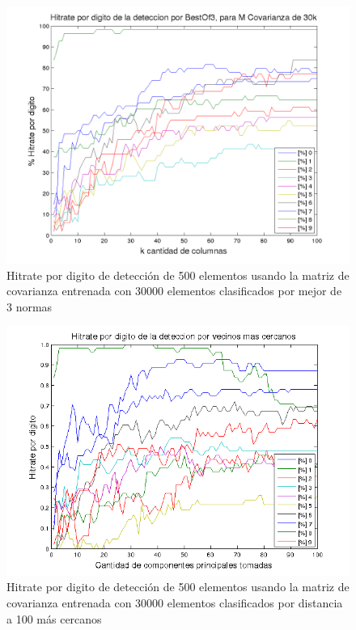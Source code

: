\begin{figure}[H]
\begin {center}
\includegraphics[width=\pdwidth]{plots/pordig-30kcv-BestOf3.png}
\end {center}
\caption{Hitrate por digito de detecci\'on de 500 elementos usando la matriz de covarianza entrenada con 30000 elementos
clasificados por mejor de 3 normas}
\label{fig:HRD30kcv-bo3}
\end{figure}

\begin{figure}[H]
\begin {center}
\includegraphics[width=\pdwidth]{plots/pordig-30kcv-top100.png}
\end {center}
\caption{Hitrate por digito de detecci\'on de 500 elementos usando la matriz de covarianza entrenada con 30000 elementos
clasificados por distancia a 100 m\'as cercanos}
\label{fig:HRD30kcv-dist100}
\end{figure}

